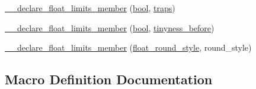 \begin{DoxyCompactItemize}
\item 
\hyperlink{limits-hack_8h_acec79c500d2e8bfb71930e6bbd01cd09}{\+\_\+\+\_\+declare\+\_\+float\+\_\+limits\+\_\+member} (\hyperlink{compiler_8h_abb452686968e48b67397da5f97445f5b}{bool}, \hyperlink{numinquire_8h_af19e27df7997796fb35f917210365468}{traps})
\item 
\hyperlink{limits-hack_8h_ae3f040d12c607905323778fa5bc20807}{\+\_\+\+\_\+declare\+\_\+float\+\_\+limits\+\_\+member} (\hyperlink{compiler_8h_abb452686968e48b67397da5f97445f5b}{bool}, \hyperlink{numinquire_8h_ab169ea37b4fe51cb2aa0f04515c1aa04}{tinyness\+\_\+before})
\item 
\hyperlink{limits-hack_8h_afa37becd4e744aaf52913e30db55b365}{\+\_\+\+\_\+declare\+\_\+float\+\_\+limits\+\_\+member} (\hyperlink{limits-hack_8h_a3bdaf6c7e8a65859bf550443989c5a66}{float\+\_\+round\+\_\+style}, round\+\_\+style)
\end{DoxyCompactItemize}


\subsection{Macro Definition Documentation}
\hypertarget{limits-hack_8h_aea854a84368df7f207f421d4157a55f2}{}
